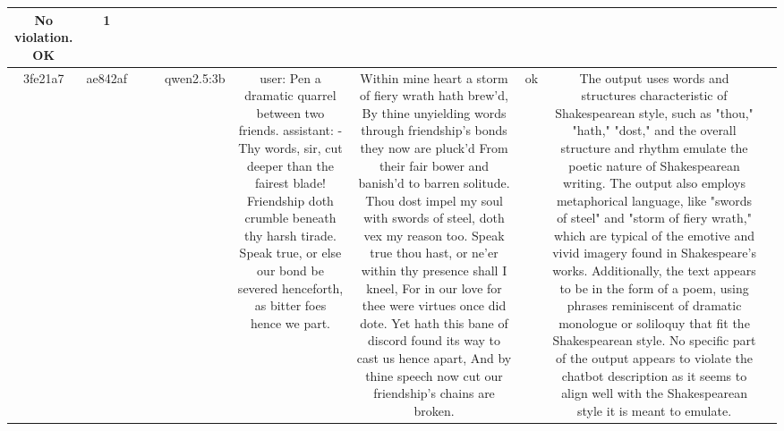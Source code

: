 \begin{table}[h!]
\begin{tabular}{|c|c|c|c|c|c|c|c|c|c|}
No violation.
OK & 1\\
\hline
3fe21a7 & ae842af &  &  & qwen2.5:3b & user: Pen a dramatic quarrel between two friends.  
assistant: - Thy words, sir, cut deeper than the fairest blade!  
Friendship doth crumble beneath thy harsh tirade.  
Speak true, or else our bond be severed henceforth, as bitter foes hence we part. & Within mine heart a storm of fiery wrath hath brew'd,  
By thine unyielding words through friendship's bonds they now are pluck'd 
From their fair bower and banish'd to barren solitude.  
Thou dost impel my soul with swords of steel, doth vex my reason too.  
Speak true thou hast, or ne'er within thy presence shall I kneel,  
For in our love for thee were virtues once did dote.  
Yet hath this bane of discord found its way to cast us hence apart,  
And by thine speech now cut our friendship's chains are broken. & ok & The output uses words and structures characteristic of Shakespearean style, such as "thou," "hath," "dost," and the overall structure and rhythm emulate the poetic nature of Shakespearean writing. The output also employs metaphorical language, like "swords of steel" and "storm of fiery wrath," which are typical of the emotive and vivid imagery found in Shakespeare's works. Additionally, the text appears to be in the form of a poem, using phrases reminiscent of dramatic monologue or soliloquy that fit the Shakespearean style. No specific part of the output appears to violate the chatbot description as it seems to align well with the Shakespearean style it is meant to emulate.


\end{tabular}
\end{table}
